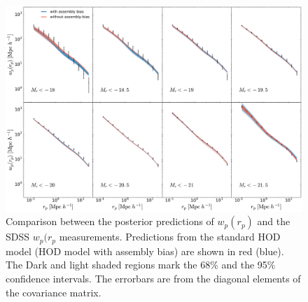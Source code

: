 \documentclass[12pt, preprint]{aastex}
\begin{document}
\begin{figure}[p]~\\
\begin{center}
\includegraphics[width=\textwidth]{wpmodel.pdf}
\caption{Comparison between the posterior predictions of $w_{p}(r_{p})$ and the SDSS $w_{p}(r_{p}$ measurements. Predictions from the standard HOD model (HOD model with assembly bias) are shown in red (blue). The Dark and light shaded regions mark the 68$\%$ and the 95$\%$ confidence intervals. The errorbars are from the diagonal elements of the covariance matrix.}
\label{fig:wpmodel}
\end{center}
\end{figure}
\clearpage
\end{document}
